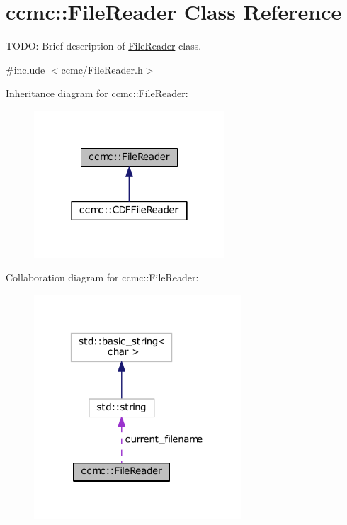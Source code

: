 \hypertarget{classccmc_1_1_file_reader}{\section{ccmc\-:\-:File\-Reader Class Reference}
\label{classccmc_1_1_file_reader}
}


T\-O\-D\-O\-: Brief description of \hyperlink{classccmc_1_1_file_reader}{File\-Reader} class.  




{\ttfamily \#include $<$ccmc/\-File\-Reader.\-h$>$}



Inheritance diagram for ccmc\-:\-:File\-Reader\-:\nopagebreak
\begin{figure}[H]
\begin{center}
\leavevmode
\includegraphics[width=202pt]{classccmc_1_1_file_reader__inherit__graph}
\end{center}
\end{figure}


Collaboration diagram for ccmc\-:\-:File\-Reader\-:\nopagebreak
\begin{figure}[H]
\begin{center}
\leavevmode
\includegraphics[width=220pt]{classccmc_1_1_file_reader__coll__graph}
\end{center}
\end{figure}
